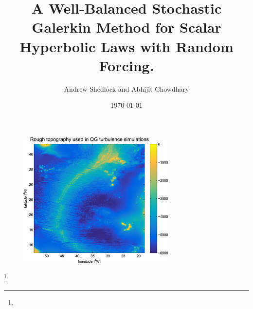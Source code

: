 \documentclass[
    pdf,
    11pt,
    xcolor={svgnames},
  ]{beamer}
\title[WBSG for Random Scalar Hyperbolic Laws]{%
  A Well-Balanced Stochastic Galerkin Method for Scalar Hyperbolic Laws with Random Forcing.
}
\author[Chowdhary, Shedlock]{%
  Andrew Shedlock and Abhijit Chowdhary
}
\institute[NCSU]{
  Department of Mathematics \\
  North Carolina State University
}
\date[MA788 NCSU]{\today}
\newcommand\blfootnote[1]{%
  \begingroup
  \renewcommand\thefootnote{}\footnote{\scriptsize #1}%
  \addtocounter{footnote}{-1}%
  \endgroup
}
\begin{document}
\frame{ \titlepage }

\begin{frame}
\begin{figure}
\centering
\includegraphics[width=0.70\textwidth]{slides/bottom_topography.jpg}
\end{figure}
\blfootnote{}
\end{frame}
\end{document}
